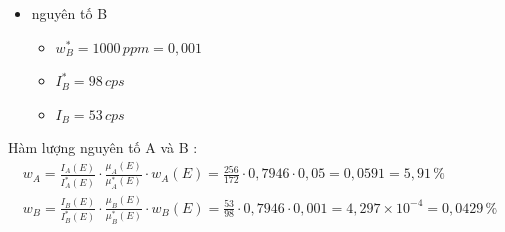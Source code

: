 \documentclass[a4paper]{article}
\begin{document}
\begin{enumerate}[label=\alph*)]
\begin{itemize}
        \item nguyên tố B
        \begin{itemize}
            \item $w_B^* = 1000\, ppm = 0,001$
            \item $I^*_B = 98 \, cps$
            \item $I_B = 53\, cps$
        \end{itemize}
    \end{itemize}
    Hàm lượng nguyên tố A và B :
    \begin{gather*}
        w_A = \frac{I_A(E)}{I_A^*(E)} \cdot \frac{\mu_A(E)}{\mu_A^*(E)} \cdot w_A(E) = \frac{256}{172} \cdot 0,7946 \cdot 0,05 = 0,0591 = 5,91 \, \%\\
        w_B = \frac{I_B(E)}{I_B^*(E)} \cdot \frac{\mu_B(E)}{\mu_B^*(E)} \cdot w_B(E) = \frac{53}{98} \cdot 0,7946 \cdot 0,001 = 4,297\times 10^{-4} = 0,0429 \,\%
    \end{gather*} 
\end{enumerate}
\end{document}
